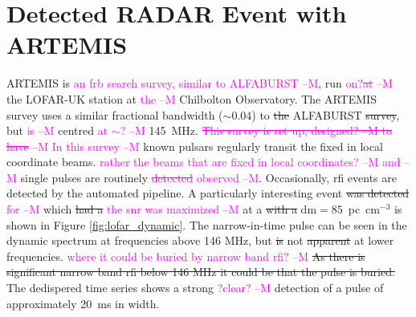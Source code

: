\documentclass[a4paper,fleqn,usenatbib]{mnras}
\newcommand{\cM}[1]{\textcolor{magenta}{ #1 --M}}
\begin{document}
\section{Detected RADAR Event with ARTEMIS}
\label{sec:LOFAR_RADAR}

ARTEMIS \citep{2015MNRAS.452.1254K} is \cM{an \gls{frb} search
survey, similar to ALFABURST}, run \cM{on?\sout{at}} the LOFAR-UK station at \cM{the} Chilbolton Observatory. The ARTEMIS survey uses a similar fractional bandwidth ($\sim 0.04$) to \sout{the} ALFABURST \sout{survey}, but \cM{is}
centred \cM{at $\sim$?} 145~MHz. \cM{\sout{This survey is \cM{set up, designed?} to have}} \cM{In this survey} known pulsars regularly
transit the fixed in local coordinate beams. \cM{rather the beams that are fixed in local coordinates?} \cM{and} single pulses are routinely
\cM{\sout{detected} observed}. Occasionally, \gls{rfi} events are detected by the automated pipeline.
A particularly interesting event \sout{was detected} \cM{for} which \sout{had a} \cM{the \gls{snr} was maximized} at a  
\sout{with a} \gls{dm}$= 85$~pc~cm$^{-3}$ is shown in Figure \ref{fig:lofar_dynamic}.
The narrow-in-time pulse can be seen in the dynamic spectrum at frequencies
above 146 MHz, but \sout{is} not \sout{apparent} at lower frequencies. \cM{where it could be buried by narrow band \gls{rfi}?} \sout{As there is significant
narrow band \gls{rfi} below 146 MHz it could be that the pulse is buried. } The
dedispered time series shows a strong\cM{?clear?} detection of a pulse of approximately
20~ms in width.
\end{document}
